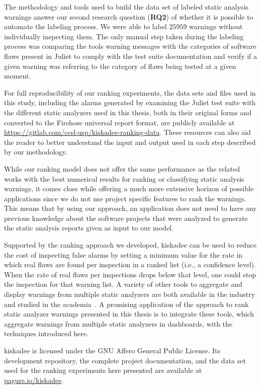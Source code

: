 The methodology and tools used to build the data set of labeled static analysis
warnings answer our second research question (\textbf{RQ2}) of whether it is
possible to automate the labeling process. We were able to 
label $25959$ warnings without individually inspecting them. The only manual step
taken during the labeling process was comparing the tools warning messages with
the categories of software flaws present in Juliet to comply with the test suite
documentation and verify if a given warning was referring to the category of flaws
being tested at a given moment.

For full reproducibility of our ranking experiments, the data sets and files
used in this study, including the alarms generated by examining the Juliet test
suite with the different static analyzers used in this thesis, both in their
original forms and converted to the Firehose universal report format, are
publicly available at
\url{https://gitlab.com/ccsl-usp/kiskadee-ranking-data}. These resources
can also aid the reader to better understand the input and output used in each
step described by our methodology.

While our ranking model does not offer the same performance as the related
works with the best numerical results for ranking or classifying static
analysis warnings, it comes close while offering a much more extensive horizon
of possible applications since we do not use project specific features to rank
the warnings. This means that by using our approach, an application does not
need to have any previous knowledge about the software projects that were
analyzed to generate the static analysis reports given as input to our model.

Supported by the ranking approach we developed, kiskadee can be used to reduce the
cost of inspecting false alarms by setting a minimum value for the rate in
which real flaws are found per inspection in a ranked list (i.e., a confidence
level). When the rate of real flaws per inspections drops below that level, one
could stop the inspection for that warning list. A variety of other tools to
aggregate and display warnings from multiple static analyzers are both
available in the industry and studied in the academia~\citep{buckers2017uav,
heinemann2014teamscale}. A promising application of the approach to rank static
analyzer warnings presented in this thesis is to integrate these tools, which
aggregate warnings from multiple static analyzers in dashboards, with the
techniques introduced here. 

kiskadee is licensed under the GNU Affero General Public License. Its
development repository, the complete project documentation, and the data set
used for the ranking experiments here presented are available at
\url{pagure.io/kiskadee}.

